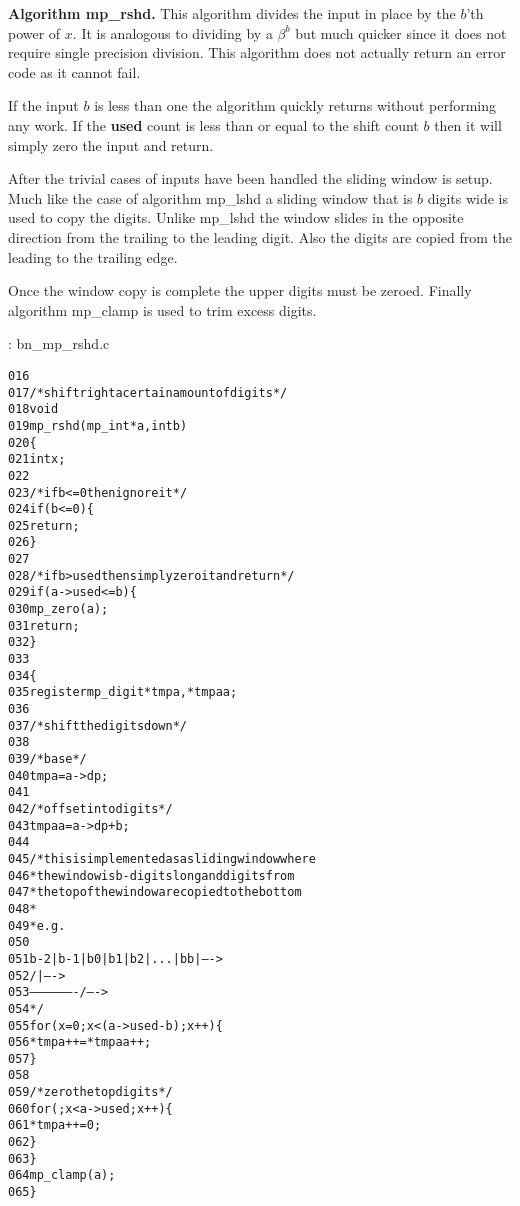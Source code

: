 \documentclass[b5paper]{book}
\begin{document}
\textbf{Algorithm mp\_rshd.}
This algorithm divides the input in place by the $b$'th power of $x$.  It is analogous to dividing by a $\beta^b$ but much quicker since
it does not require single precision division.  This algorithm does not actually return an error code as it cannot fail.  

If the input $b$ is less than one the algorithm quickly returns without performing any work.  If the \textbf{used} count is less than or equal
to the shift count $b$ then it will simply zero the input and return.

After the trivial cases of inputs have been handled the sliding window is setup.  Much like the case of algorithm mp\_lshd a sliding window that
is $b$ digits wide is used to copy the digits.  Unlike mp\_lshd the window slides in the opposite direction from the trailing to the leading digit.  
Also the digits are copied from the leading to the trailing edge.

Once the window copy is complete the upper digits must be zeroed.  Finally algorithm mp\_clamp is used to trim excess digits.

\vspace{+3mm}\begin{small}
\hspace{-5.1mm}{\bf File}: bn\_mp\_rshd.c
\vspace{-3mm}
\begin{alltt}
016   
017   /* shift right a certain amount of digits */
018   void
019   mp_rshd (mp_int * a, int b)
020   \{
021     int     x;
022   
023     /* if b <= 0 then ignore it */
024     if (b <= 0) \{
025       return;
026     \}
027   
028     /* if b > used then simply zero it and return */
029     if (a->used <= b) \{
030       mp_zero (a);
031       return;
032     \}
033   
034     \{
035       register mp_digit *tmpa, *tmpaa;
036   
037       /* shift the digits down */
038   
039       /* base */
040       tmpa = a->dp;
041   
042       /* offset into digits */
043       tmpaa = a->dp + b;
044   
045       /* this is implemented as a sliding window where 
046        * the window is b-digits long and digits from 
047        * the top of the window are copied to the bottom
048        *
049        * e.g.
050   
051        b-2 | b-1 | b0 | b1 | b2 | ... | bb |   ---->
052                    /                   |      ---->
053                     -------------------/      ---->
054        */
055       for (x = 0; x < (a->used - b); x++) \{
056         *tmpa++ = *tmpaa++;
057       \}
058   
059       /* zero the top digits */
060       for (; x < a->used; x++) \{
061         *tmpa++ = 0;
062       \}
063     \}
064     mp_clamp (a);
065   \}
\end{alltt}
\end{small}
\end{document}
